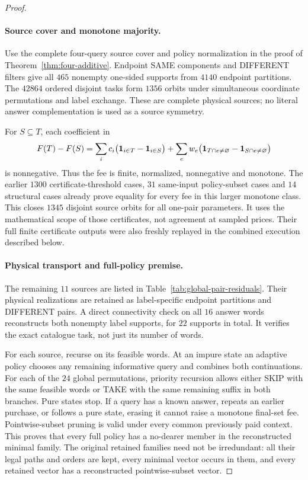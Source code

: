 \begin{proof}
\paragraph*{Source cover and monotone majority.}
Use the complete four-query source cover and policy normalization in
the proof of Theorem~\ref{thm:four-additive}. Endpoint SAME components
and DIFFERENT filters give all $465$ nonempty one-sided supports from
$4140$ endpoint partitions. The $42864$ ordered disjoint tasks form
$1356$ orbits under simultaneous coordinate permutations and label
exchange. These are complete physical sources; no literal answer
complementation is used as a source symmetry.

For $S\subseteq T$, each coefficient in
\[
 F(T)-F(S)=\sum_i c_i\bigl({\bf1}_{i\in T}-{\bf1}_{i\in S}\bigr)
  +\sum_e w_e\bigl({\bf1}_{T\cap e\ne\varnothing}
                         -{\bf1}_{S\cap e\ne\varnothing}\bigr)
\]
is nonnegative. Thus the fee is finite, normalized, nonnegative and
monotone. The earlier $1300$ certificate-threshold cases, $31$
same-input policy-subset cases and $14$ structural cases already prove
equality for every fee in this larger monotone class. This closes
$1345$ disjoint source orbits for all one-pair parameters. It uses the
mathematical scope of those certificates, not agreement at sampled
prices. Their full finite certificate outputs were also freshly
replayed in the combined execution described below.

\paragraph*{Physical transport and full-policy premise.}
The remaining $11$ sources are listed in
Table~\ref{tab:global-pair-residuals}. Their physical realizations are
retained as label-specific endpoint partitions and DIFFERENT pairs.
A direct connectivity check on all $16$ answer words reconstructs
both nonempty label supports, for $22$ supports in total. It verifies
the exact catalogue task, not just its number of words.

For each source, recurse on its feasible words. At an impure state an
adaptive policy chooses any remaining informative query and combines
both continuations. For each of the $24$ global permutations, priority
recursion allows either SKIP with the same feasible words or TAKE
with the same remaining suffix in both branches. Pure states stop.
If a query has a known answer, repeats an earlier purchase, or follows
a pure state, erasing it cannot raise a monotone final-set fee.
Pointwise-subset pruning is valid under every common previously paid
context. This proves that every full policy has a no-dearer member in
the reconstructed minimal family. The original retained families need
not be irredundant: all their legal paths and orders are kept, every
minimal vector occurs in them, and every retained vector has a
reconstructed pointwise-subset vector.


\end{proof}
